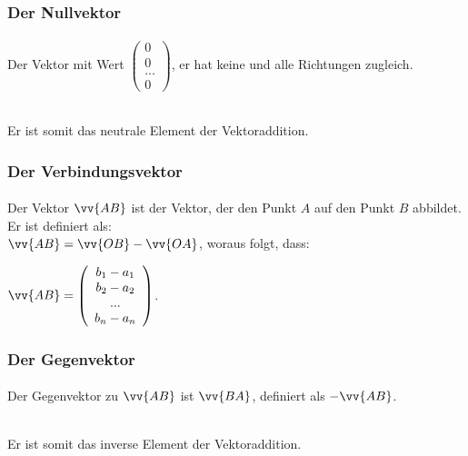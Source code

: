         \subsubsection{Der Nullvektor}

            \paragraph{} Der Vektor mit Wert $\left(\begin{array}{c} 0 \\ 0 \\ ...\\0\end{array}\right)$, er hat keine und alle Richtungen zugleich.
            \begin{Bemerkung}
                \\
                Er ist somit das neutrale Element der Vektoraddition.
            \end{Bemerkung}


        \subsubsection{Der Verbindungsvektor}

            \paragraph{} Der Vektor $\vv{AB}$ ist der Vektor, der den Punkt $A$ auf den Punkt $B$ abbildet. Er ist definiert als:\\ $\vv{AB}=\vv{OB}-\vv{OA}$,
             woraus folgt, dass: \begin{center} $\vv{AB} = \left(\begin{array}{c} b_1 - a_1 \\ b_2 - a_2 \\ ... \\ b_n - a_n \end{array}\right)$. \end{center}


        \subsubsection{Der Gegenvektor}

            \paragraph{} Der Gegenvektor zu $\vv{AB}$ ist $\vv{BA}$, definiert als  $-\vv{AB}$.
            \\
            \begin{Bemerkung}
                \\
                Er ist somit das inverse Element der Vektoraddition.
            \end{Bemerkung}


